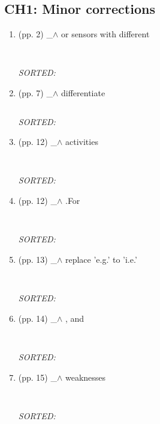 \documentclass[12pt]{article}
\begin{document}
\subsection{CH1: Minor corrections}
\begin{enumerate}
\item   (pp. 2)  \_$\wedge$  
	or sensors with different
	\begin{verbatim}
	
	\end{verbatim}
	\textit{
	SORTED:  
	}
	\\
	

\item   (pp. 7)  \_$\wedge$  
	differentiate 
	\begin{verbatim}

	\end{verbatim}
	\textit{
	SORTED:  
	}
	\\

\item  (pp. 12)  \_$\wedge$  
	activities
	\begin{verbatim}
	
	\end{verbatim}
	\textit{
	SORTED:  
	}
	\\

\item  (pp. 12)  \_$\wedge$  
	.For
	\begin{verbatim}
	
	\end{verbatim}
	\textit{
	SORTED:  
	}
	\\


\item  (pp. 13)  \_$\wedge$  
	replace 'e.g.' to 'i.e.'
	\begin{verbatim}
	
	\end{verbatim}
	\textit{
	SORTED:  
	}
	\\




\item  (pp. 14)  \_$\wedge$  
	, and
	\begin{verbatim}
	
	\end{verbatim}
	\textit{
	SORTED:  
	}
	\\

\item  (pp. 15)  \_$\wedge$  
	weaknesses 
	\begin{verbatim}
	
	\end{verbatim}
	\textit{
	SORTED:  
	}
	\\


\end{enumerate}
\end{document}
